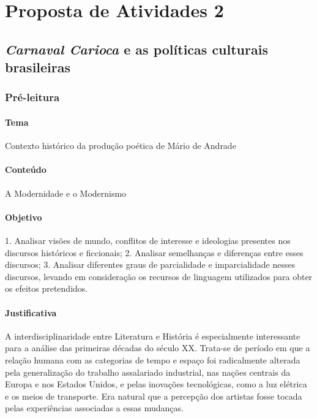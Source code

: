 \documentclass[11pt]{extarticle}
\begin{document}
\section{Proposta de Atividades 2}

\subsection{\emph{Carnaval Carioca} e as políticas culturais brasileiras}

\subsubsection{Pré-leitura}


\paragraph{Tema} Contexto histórico da produção poética de Mário de
Andrade

\paragraph{Conteúdo} A Modernidade e o Modernismo

\paragraph{Objetivo} 1. Analisar visões de mundo, conflitos de interesse e
ideologias presentes nos discursos históricos e ficcionais; 2. Analisar
semelhanças e diferenças entre esses discursos; 3. Analisar diferentes
graus de parcialidade e imparcialidade nesses discursos, levando em
consideração os recursos de linguagem utilizados para obter os efeitos
pretendidos.

\paragraph{Justificativa} A interdisciplinaridade entre Literatura e
História é especialmente interessante para a análise das primeiras
décadas do século XX. Trata-se de período em que a relação humana com as
categorias de tempo e espaço foi radicalmente alterada pela
generalização do trabalho assalariado industrial, nas nações centrais da
Europa e nos Estados Unidos, e pelas inovações tecnológicas, como a luz
elétrica e os meios de transporte. Era natural que a percepção dos
artistas fosse tocada pelas experiências associadas a essas mudanças.
\end{document}

